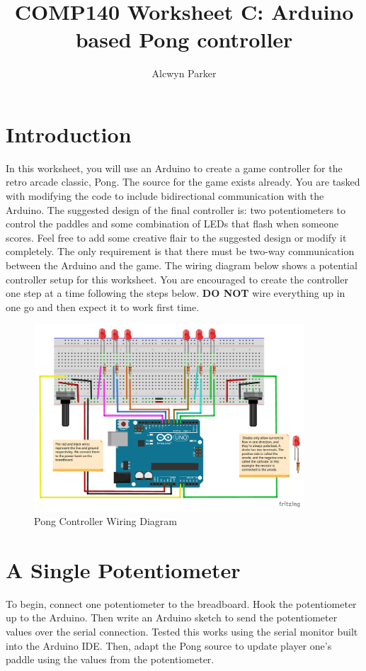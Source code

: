 \documentclass{../../../fal_assignment}
\title{COMP140 Worksheet C: Arduino based Pong controller}
\author{Alcwyn Parker}
\begin{document}
\maketitle



\section*{Introduction}

In this worksheet, you will use an Arduino to create a game controller for the retro arcade classic, Pong. The source for the game exists already. You are tasked with modifying the code to include bidirectional communication with the Arduino. The suggested design of the final controller is: two potentiometers to control the paddles and some combination of LEDs that flash when someone scores. Feel free to add some creative flair to the suggested design or modify it completely. The only requirement is that there must be two-way communication between the Arduino and the game. The wiring diagram below shows a potential controller setup for this worksheet. You are encouraged to create the controller one step at a time following the steps below. \textbf{DO NOT} wire everything up in one go and then expect it to work first time. 

\begin{figure}[!h]
	\begin{center}
		\includegraphics[width=0.9\textwidth]{assets/arduino-pong.pdf}
	\end{center}
	\caption{Pong Controller Wiring Diagram}
	\label{fig:wiring}
\end{figure}

\section{A Single Potentiometer} \label{arduino-first}
To begin, connect one potentiometer to the breadboard. Hook the potentiometer up to the Arduino. Then write an Arduino sketch to send the potentiometer values over the serial connection. Tested this works using the serial monitor built into the Arduino IDE. Then, adapt the Pong source to update player one's paddle using the values from the potentiometer. 
\end{document}
